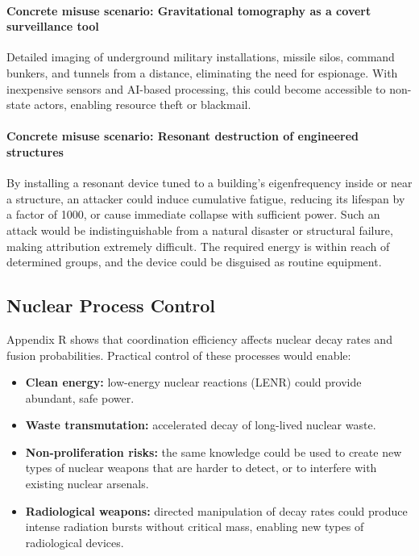 \documentclass[12pt,a4paper]{article}
\theoremstyle{remark}
\begin{document}
	\paragraph{Concrete misuse scenario: Gravitational tomography as a covert surveillance tool}
	Detailed imaging of underground military installations, missile silos, command bunkers, and tunnels from a distance, eliminating the need for espionage. With inexpensive sensors and AI-based processing, this could become accessible to non-state actors, enabling resource theft or blackmail.
	
	\paragraph{Concrete misuse scenario: Resonant destruction of engineered structures}
	By installing a resonant device tuned to a building's eigenfrequency inside or near a structure, an attacker could induce cumulative fatigue, reducing its lifespan by a factor of 1000, or cause immediate collapse with sufficient power. Such an attack would be indistinguishable from a natural disaster or structural failure, making attribution extremely difficult. The required energy is within reach of determined groups, and the device could be disguised as routine equipment.
	
	\subsection{Nuclear Process Control}
	\label{subsec:nuclear}
	
	Appendix R shows that coordination efficiency affects nuclear decay rates and fusion probabilities. Practical control of these processes would enable:
	\begin{itemize}[leftmargin=*]
		\item \textbf{Clean energy:} low-energy nuclear reactions (LENR) could provide abundant, safe power.
		\item \textbf{Waste transmutation:} accelerated decay of long-lived nuclear waste.
		\item \textbf{Non-proliferation risks:} the same knowledge could be used to create new types of nuclear weapons that are harder to detect, or to interfere with existing nuclear arsenals.
		\item \textbf{Radiological weapons:} directed manipulation of decay rates could produce intense radiation bursts without critical mass, enabling new types of radiological devices.
	\end{itemize}
	
\end{document}
